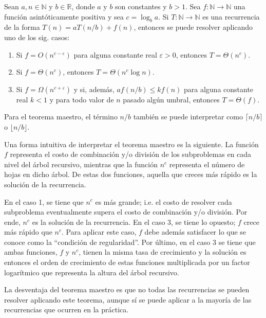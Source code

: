 \begin{thm}
    Sean $a,n\in\mathbb{N}$ y $b\in\mathbb{R}$, donde $a$ y $b$ son
    constantes y $b>1$. Sea $f:\mathbb{N}\to\mathbb{N}$ una función
    asintóticamente positiva y sea $c=\log_{b}a$. Si $T:\mathbb{N}\to\mathbb{N}$
    es una recurrencia de la forma $T(n)=aT(n/b)+f(n)$, entonces se puede
    resolver aplicando uno de los sig. casos:
    \begin{enumerate}
        \item Si $f=O(n^{c-\varepsilon})$ para alguna constante real $\varepsilon>0$,
        entonces $T=\Theta(n^{c})$.
        \item Si $f=\Theta(n^{c})$, entonces $T=\Theta(n^{c}\log n)$.
        \item Si $f=\Omega(n^{c+\varepsilon})$ y si, además, $af(n/b)\leq kf(n)$
        para alguna constante real $k<1$ y para todo valor de $n$ pasado
        algún umbral, entonces $T=\Theta(f)$.
    \end{enumerate}
\end{thm}

\begin{rem}
    Para el teorema maestro, el término $n/b$ también se puede interpretar
    como $\lceil n/b\rceil$ o $\lfloor n/b\rfloor$.
\end{rem}

Una forma intuitiva de interpretar el teorema maestro es la siguiente.
La función $f$ representa el costo de combinación y/o división de los subproblemas
en cada nivel del árbol recursivo, mientras que la función $n^c$ representa
el número de hojas en dicho árbol. De estas dos funciones, aquella que creces
más rápido es la solución de la recurrencia. 

En el caso 1, se tiene que $n^c$
es más grande; i.e. el costo de resolver cada subproblema eventualmente
supera el costo de combinación y/o división. Por ende, $n^c$ es la solución de la 
recurrencia. En el caso 3, se tiene lo opuesto; $f$ crece más rápido que $n^c$.
Para aplicar este caso, $f$ debe además satisfacer lo que se conoce como
la ``condición de regularidad''.
Por último, en el caso 3 se tiene que ambas funciones, $f$ y $n^c$, tienen
la misma tasa de crecimiento y la solución es entonces el orden de crecimiento
de estas funciones multiplicada por un factor logarítmico que representa
la altura del árbol recursivo.

La desventaja del teorema maestro es que no todas las recurrencias se pueden
resolver aplicando este teorema, aunque sí se puede aplicar a la mayoría de 
las recurrencias que ocurren en la práctica.

